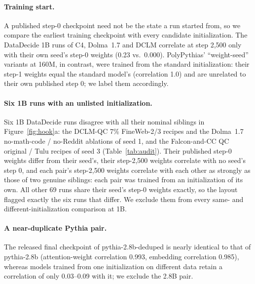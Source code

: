\documentclass[11pt]{article}
\begin{document}
\paragraph{Training start.}
A published step-0 checkpoint need not be the state a run started from, so we compare the earliest training checkpoint with every candidate initialization.
The DataDecide 1B runs of C4, Dolma~1.7 and DCLM correlate at step 2{,}500 only with their own seed's step-0 weights (0.23 vs.\ 0.000).
PolyPythias' ``weight-seed'' variants at 160M, in contrast, were trained from the standard initialization: their step-1 weights equal the standard model's (correlation 1.0) and are unrelated to their own published step 0; we label them accordingly.

\paragraph{Six 1B runs with an unlisted initialization.}
Six 1B DataDecide runs disagree with all their nominal siblings in Figure~\ref{fig:hook}a: the DCLM-QC 7\% FineWeb-2/3 recipes and the Dolma~1.7 no-math-code / no-Reddit ablations of seed 1, and the Falcon-and-CC QC original / Tulu recipes of seed 3 (Table~\ref{tab:audit}).
Their published step-0 weights differ from their seed's, their step-2{,}500 weights correlate with no seed's step 0, and each pair's step-2{,}500 weights correlate with each other as strongly as those of two genuine siblings: each pair was trained from an initialization of its own.
All other 69 runs share their seed's step-0 weights exactly, so the layout flagged exactly the six runs that differ.
We exclude them from every same- and different-initialization comparison at 1B.

\paragraph{A near-duplicate Pythia pair.}
The released final checkpoint of pythia-2.8b-deduped is nearly identical to that of pythia-2.8b (attention-weight correlation 0.993, embedding correlation 0.985), whereas models trained from one initialization on different data retain a correlation of only 0.03--0.09 with it; we exclude the 2.8B pair.
\end{document}

